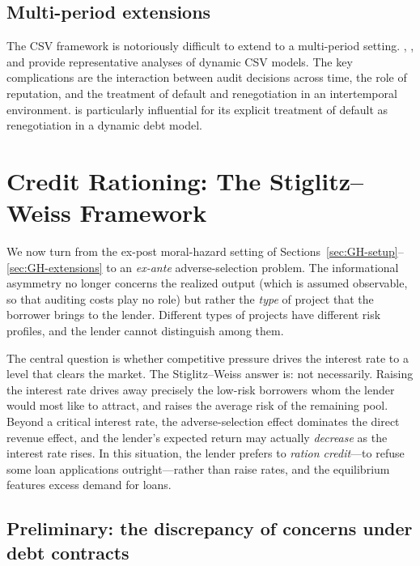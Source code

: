 \documentclass[11pt,a4paper,oneside]{book}
\theoremstyle{plain}
\theoremstyle{definition}
\theoremstyle{remark}
\numberwithin{equation}{chapter}
\begin{document}
\subsection{Multi-period extensions}

The CSV framework is notoriously difficult to extend to a multi-period setting.
\citet{Chang1990}, \citet{Webb1992}, and \citet{HartMoore1998} provide representative analyses of dynamic CSV models.
The key complications are the interaction between audit decisions across time, the role of reputation, and the treatment of default and renegotiation in an intertemporal environment.
\citet{HartMoore1998} is particularly influential for its explicit treatment of default as renegotiation in a dynamic debt model.

\section{Credit Rationing: The Stiglitz--Weiss Framework}
\label{sec:SW}

We now turn from the ex-post moral-hazard setting of Sections~\ref{sec:GH-setup}--\ref{sec:GH-extensions} to an \emph{ex-ante} adverse-selection problem.
The informational asymmetry no longer concerns the realized output (which is assumed observable, so that auditing costs play no role) but rather the \emph{type} of project that the borrower brings to the lender.
Different types of projects have different risk profiles, and the lender cannot distinguish among them.

The central question is whether competitive pressure drives the interest rate to a level that clears the market.
The Stiglitz--Weiss answer is: not necessarily.
Raising the interest rate drives away precisely the low-risk borrowers whom the lender would most like to attract, and raises the average risk of the remaining pool.
Beyond a critical interest rate, the adverse-selection effect dominates the direct revenue effect, and the lender's expected return may actually \emph{decrease} as the interest rate rises.
In this situation, the lender prefers to \emph{ration credit}---to refuse some loan applications outright---rather than raise rates, and the equilibrium features excess demand for loans.

\subsection{Preliminary: the discrepancy of concerns under debt contracts}
\end{document}
